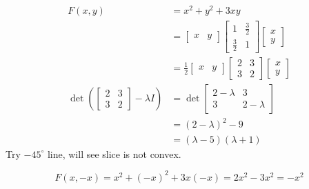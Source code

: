 \begin{example}
	\begin{align*}
	F(x,y) &= x^2 + y^2 + 3xy \\
	&= \begin{bmatrix}
	x&y
	\end{bmatrix}\begin{bmatrix}
	1&\frac{3}{2}\\
	\frac{3}{2} & 1
	\end{bmatrix}\begin{bmatrix}
	x\\
	y
	\end{bmatrix}\\
	&=\frac{1}{2}\begin{bmatrix}
	x&y
	\end{bmatrix}\begin{bmatrix}
	2&3\\
	3 & 2
	\end{bmatrix}\begin{bmatrix}
	x\\
	y
	\end{bmatrix}\\
	\det(\begin{bmatrix}
	2&3\\
	3&2
	\end{bmatrix} - \lambda I) &= \det\begin{bmatrix}
	2-\lambda & 3\\
	3 & 2-\lambda
	\end{bmatrix}\\
	&= (2-\lambda)^2 - 9\\
	&= (\lambda - 5)(\lambda + 1)
	\end{align*}
	Try $-45^{\circ}$ line, will see slice is not convex.
	
	\begin{equation*}
	F(x,-x) = x^2 + (-x)^2 + 3x(-x) = 2x^2 - 3x^2 = -x^2
	\end{equation*}
	
\end{example}

